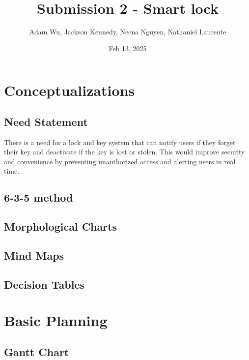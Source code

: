 \documentclass{article}
\title{Submission 2 - Smart lock} %
\author{Adam Wu, Jackson Kennedy, Neena Nguyen, Nathaniel Laurente}
\date{Feb 13, 2025}
\begin{document}
\maketitle

\tableofcontents
\newpage

\section{Conceptualizations}
\subsection{Need Statement}
There is a need for a lock and key system that can notify users if they forget their key and deactivate if the key is lost or stolen. This would improve security and convenience by preventing unauthorized access and alerting users in real time.


\subsection{6-3-5 method}

\subsection{Morphological Charts}

\subsection{Mind Maps}

\subsection{Decision Tables}

\section{Basic Planning}
\subsection{Gantt Chart}
\end{document}

